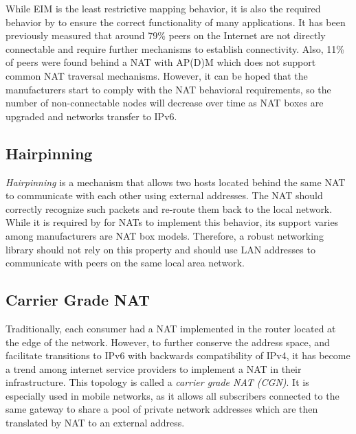 While EIM is the least restrictive mapping behavior, it is also the required behavior by \cite{behave} to ensure the correct functionality of many applications. It has been previously measured that around 79\% peers on the Internet are not directly connectable and require further mechanisms to establish connectivity. Also, 11\% of peers were found behind a NAT with AP(D)M which does not support common NAT traversal mechanisms. \cite{nat_wild} However, it can be hoped that the manufacturers start to comply with the NAT behavioral requirements, so the number of non-connectable nodes will decrease over time as NAT boxes are upgraded and networks transfer to IPv6.


\subsection{Hairpinning}

\textit{Hairpinning} is a  mechanism that allows two hosts located behind the same NAT to communicate with each other using external addresses. The NAT should correctly recognize such packets and re-route them back to the local network. While it is required by \cite{behave} for NATs to implement this behavior, its support varies among manufacturers are NAT box models. Therefore, a robust networking library should not rely on this property and should use LAN addresses to communicate with peers on the same local area network.


\subsection{Carrier Grade NAT}

Traditionally, each consumer had a NAT implemented in the router located at the edge of the network. However, to further conserve the address space, and facilitate transitions to IPv6 with backwards compatibility of IPv4, it has become a trend among internet service providers to implement a NAT in their infrastructure. This topology is called a \textit{carrier grade NAT (CGN)}. It is especially used in mobile networks, as it allows all subscribers connected to the same gateway to share a pool of private network addresses which are then translated by NAT to an external address.

